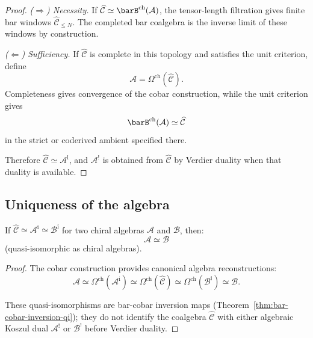 \begin{proof}
\emph{($\Rightarrow$) Necessity.}
If $\widehat{\mathcal{C}}\simeq\barB^{\mathrm{ch}}(\mathcal{A})$,
the tensor-length filtration gives finite bar windows
$\widehat{\mathcal{C}}_{\leq N}$. The completed bar coalgebra is the
inverse limit of these windows by construction.

\emph{($\Leftarrow$) Sufficiency.}
If $\widehat{\mathcal{C}}$ is complete in this topology and satisfies
the unit criterion, define
\[
\mathcal{A}=\Omega^{\mathrm{ch}}(\widehat{\mathcal{C}}).
\]
Completeness gives convergence of the cobar construction, while the
unit criterion gives
\[
\barB^{\mathrm{ch}}(\mathcal{A}) \simeq \widehat{\mathcal{C}}
\]
in the strict or coderived ambient specified there.

Therefore
$\widehat{\mathcal{C}}\simeq\mathcal{A}^{\mathrm i}$, and
$\mathcal{A}^{!}$ is obtained from
$\widehat{\mathcal{C}}$ by Verdier duality when that duality is
available.
\end{proof}

\subsection{Uniqueness of the algebra}

\begin{theorem}\label{thm:uniqueness-algebra}
If $\widehat{\mathcal{C}}\simeq \mathcal{A}^{\mathrm i}
\simeq \mathcal{B}^{\mathrm i}$ for two chiral algebras
$\mathcal{A}$ and $\mathcal{B}$, then:
\[\mathcal{A} \simeq \mathcal{B}\]
(quasi-isomorphic as chiral algebras).
\end{theorem}

\begin{proof}
The cobar construction provides canonical algebra reconstructions:
\[
\mathcal{A}\simeq
\Omega^{\mathrm{ch}}(\mathcal{A}^{\mathrm i})
\simeq
\Omega^{\mathrm{ch}}(\widehat{\mathcal{C}})
\simeq
\Omega^{\mathrm{ch}}(\mathcal{B}^{\mathrm i})
\simeq
\mathcal{B}.
\]

These quasi-isomorphisms are bar-cobar inversion maps
(Theorem~\ref{thm:bar-cobar-inversion-qi}); they do not identify the
coalgebra $\widehat{\mathcal{C}}$ with either algebraic Koszul dual
$\mathcal{A}^{!}$ or $\mathcal{B}^{!}$ before Verdier duality.
\end{proof}

